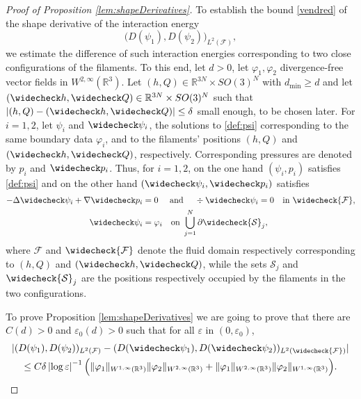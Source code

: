 \documentclass[JEP,XML,SOM,Unicode, NoEqCountersInSection,NoFloatCountersInSection,published]{cedram}
\newcommand{\R}{\mathbb{R}}
\let\eps\varepsilon
\newcommand{\dmin}{d_{\min}}
\theoremstyle{definition}
\theoremstyle{remark}
\begin{document}
\begin{proof}[Proof of Proposition \ref{lem:shapeDerivatives}]
To establish the bound \eqref{vendred} of the shape derivative of the interaction energy
\[
\big(D (\psi_1),D (\psi_2)\big)_{L^2(\mathcal F)},\] we estimate the difference of such interaction energies
corresponding to two close configurations of the filaments.
To this end, let $d>0$, let $\varphi_1,\varphi_2 $ divergence-free vector fields in $W^{2,\infty}(\R^3)$. Let $(h,Q) \in \R^{3N} \times SO(3)^N$ with $\dmin \geq d$
and let $(\widecheck h,\widecheck Q) \in \R^{3N} \times SO(3)^N$ such that $|(h, Q) - (\widecheck h,\widecheck Q)| \leq \delta$ small enough, to be chosen later.
For $i = 1,2$, let $\psi_i$ and $ \widecheck \psi_i$, the solutions to \eqref{def:psi} corresponding to the same boundary data $\varphi_i$, and to the filaments' positions $(h, Q)$ and $(\widecheck h,\widecheck Q)$, respectively. Corresponding pressures are denoted by $p_i$ and $\widecheck p_i$.
Thus, for $i = 1,2$, on the one hand $(\psi_i,p_i)$ satisfies \eqref{def:psi}
and on the other hand $(\widecheck \psi_i,\widecheck p_i)$ satisfies
\begin{equation} \label{def:psi-bar}
\begin{aligned}
- \Delta \widecheck \psi_i + \nabla \widecheck p_i &= 0 \quad \text{ and } \quad \div \widecheck \psi_i = 0 \quad \text{in } \widecheck {\mathcal F}, \\
\widecheck \psi_i &= \varphi_i \quad \text{on } \bigcup_{j=1}^N \partial \widecheck {\mathcal S}_j,
\end{aligned}
\end{equation}
where $\mathcal F$ and $\widecheck {\mathcal F}$ denote the fluid domain respectively corresponding to $(h, Q)$ and $(\widecheck h, \widecheck Q)$, while the sets ${\mathcal S}_j$ and $\widecheck {\mathcal S}_j$ are the positions respectively occupied by the filaments in the two configurations.

To prove Proposition \ref{lem:shapeDerivatives}
we are going to prove that there are $C(d)>0$ and $\eps_0(d) >0$ such that for all $\eps$ in $(0, \eps_0)$,
\begin{multline} \label{est:psi_1.psi_2}
|(D(\psi_1),D(\psi_2))_{L^2(\mathcal F)} - (D(\widecheck \psi_1),D(\widecheck \psi_2))_{L^2(\widecheck{\mathcal F})}|
\\ \leq C\delta \left|\log \eps\right|^{-1}
\Bigl(\|\varphi_1\|_{W^{1,\infty} (\R^3) } \|\varphi_2\|_{W^{2,\infty} (\R^3)}
+
\|\varphi_1\|_{W^{2,\infty} (\R^3) } \|\varphi_2\|_{W^{1,\infty} (\R^3)}
\Bigr).
\end{multline}


\end{proof}
\end{document}
